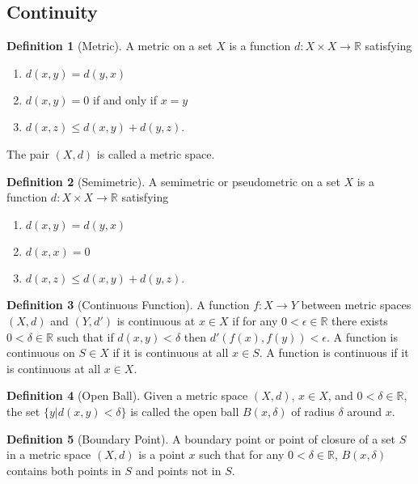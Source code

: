 \documentclass[letterpaper,12pt]{article}
\theoremstyle{plain}
\theoremstyle{plain}
\theoremstyle{definition}
\newtheorem{defn}{Definition}
\begin{document}
\subsection{Continuity}
\begin{defn}[Metric]\label{defmtrc}
A metric on a set $X$ is a function $d:X \times X \rightarrow \mathbb{R}$ satisfying
\begin{enumerate}
\item $d(x,y) = d(y,x)$
\item $d(x,y)=0$ if and only if $x=y$
\item $d(x,z)\le d(x,y)+d(y,z)$.
\end{enumerate}
The pair $(X,d)$ is called a metric space.
\end{defn}
\begin{defn}[Semimetric]\label{defsmtr}
A semimetric or pseudometric on a set $X$ is a function $d:X \times X \rightarrow \mathbb{R}$ satisfying
\begin{enumerate}
\item $d(x,y) = d(y,x)$
\item $d(x,x)=0$
\item $d(x,z)\le d(x,y)+d(y,z)$.
\end{enumerate}
\end{defn}

\begin{defn}[Continuous Function]\label{defcont}
A function $f:X\rightarrow Y$ between metric spaces $(X,d)$ and $(Y,d')$ is continuous at $x\in X$ if for any $0<\epsilon\in \mathbb{R}$ there exists $0<\delta\in \mathbb{R}$ such that if $d(x,y)<\delta$ then $d'\left( f(x),f(y)\right)<\epsilon$. A function is continuous on $S\in X$ if it is continuous at all $x\in S$. A function is continuous if it is continuous at all $x\in X$.
\end{defn}

\begin{defn}[Open Ball]\label{defoball}
Given a metric space $(X,d)$, $x\in X$, and $0<\delta\in \mathbb{R}$, the set $\{y|d(x,y)<\delta\}$ is called the open ball $B(x,\delta)$ of radius $\delta$ around $x$.
\end{defn}

\begin{defn}[Boundary Point]\label{defbpnt}
A boundary point or point of closure of a set $S$ in a metric space $(X,d)$ is a point $x$ such that for any $0<\delta\in\mathbb{R}$, $B(x,\delta)$ contains both points in $S$ and points not in $S$.
\end{defn}
\end{document}
